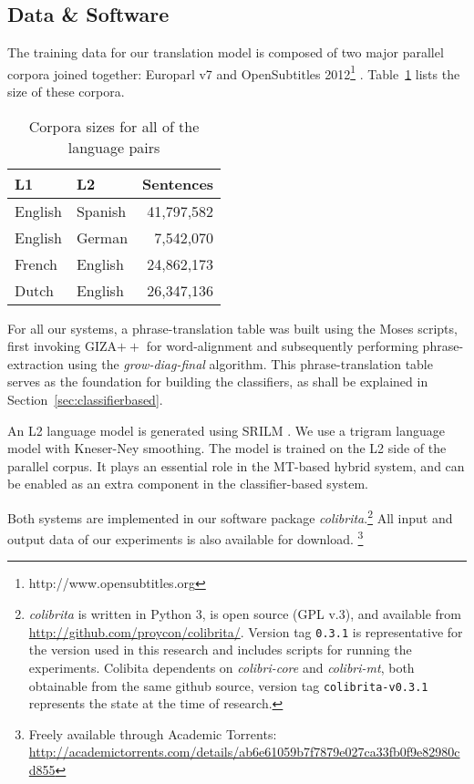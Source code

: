 \subsection{Data \& Software}

The training data for our translation model is composed of two major
parallel corpora joined together: Europarl v7 \citep{EUROPARL} and
OpenSubtitles 2012\footnote{http://www.opensubtitles.org}
\citep{OPUS2012}.  Table~\ref{tab:datasize} lists the size of these
corpora. 

\begin{table}[htb]
\begin{center}
\caption{Corpora sizes for all of the language pairs}
\label{tab:datasize}
\begin{tabular}{|l|l|r|}
\hline
L1 & L2 & Sentences \\
\hline
English & Spanish &  41,797,582 \\
English & German & 7,542,070 \\
French & English & 24,862,173 \\
Dutch & English & 26,347,136 \\
\hline
\end{tabular}
\end{center}
\end{table}

For all our systems, a phrase-translation table was built using the Moses
scripts, first invoking GIZA$++$ for word-alignment and subsequently performing
phrase-extraction using the \emph{grow-diag-final} algorithm. This
phrase-translation table serves as the foundation for building the classifiers,
as shall be explained in Section~\ref{sec:classifierbased}.

An L2 language model is generated using SRILM \citep{SRILM}. We use a trigram
language model with Kneser-Ney smoothing. The model is trained on the L2 side
of the parallel corpus. It plays an essential role in the MT-based hybrid system,
and can be enabled as an extra component in the classifier-based system. 

Both systems are implemented in our software package
\emph{colibrita}.\footnote{\emph{colibrita} is written in Python 3, is open source
  (GPL v.3), and available from
  \url{http://github.com/proycon/colibrita/}. Version tag
  \texttt{0.3.1} is representative for the version used in this
  research and includes scripts for running the experiments.
  Colibita dependents on \emph{colibri-core} and \emph{colibri-mt}, both obtainable from the same github source, version tag \texttt{colibrita-v0.3.1} represents the state at
  the time of research.
  }
All input and output data of our experiments is also available for
download. \footnote{Freely available through Academic Torrents: \url{http://academictorrents.com/details/ab6e61059b7f7879e027ca33fb0f9e82980cd855} }

